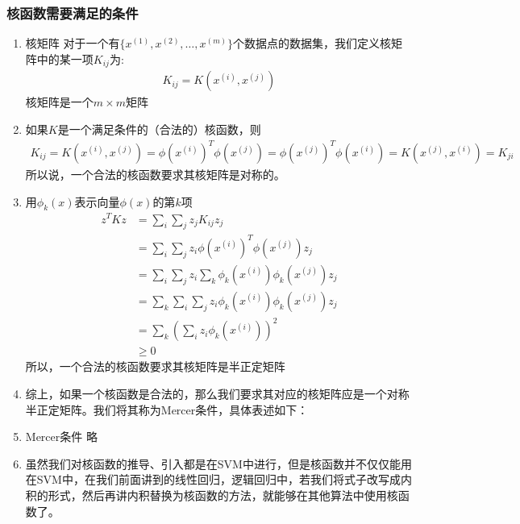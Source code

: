 \subsubsection{核函数需要满足的条件}
\begin{enumerate}
	\item 核矩阵
	对于一个有$\{x^{(1)}, x^{(2)}, \dots, x^{(m)}\}$个数据点的数据集，我们定义核矩阵中的某一项$K_{ij}$为:
	\begin{align}
		K_{ij} = K(x^{(i)}, x^{(j)})
	\end{align}
	核矩阵是一个$m\times m$矩阵
	\item 如果$K$是一个满足条件的（合法的）核函数，则
	\begin{align}
		K_{ij} = K(x^{(i)}, x^{(j)}) = \phi(x^{(i)})^T\phi(x^{(j)}) = \phi(x^{(j)})^T\phi(x^{(i)}) = K(x^{(j)}, x^{(i)}) = K_{ji}
	\end{align}
	所以说，一个合法的核函数要求其核矩阵是对称的。
	\item 用$\phi_k(x)$表示向量$\phi(x)$的第$k$项
	\begin{align}
		z^TKz &= \sum_{i}\sum_{j}z_j K_{ij} z_j \\
		&= \sum_{i}\sum_{j} z_i \phi(x^{(i)})^T \phi(x^{(j)}) z_j \\
		&= \sum_{i}\sum_{j}z_i \sum_{k}\phi_k(x^{(i)})\phi_k(x^{(j)})z_j \\
		&= \sum_{k}\sum_{i}\sum_{j}z_i \phi_k(x^{(i)}) \phi_k(x^{(j)}) z_j \\
		&= \sum_{k} \left(\sum_{i}z_i \phi_k(x^{(i)}) \right)^2 \\
		& \geq 0
	\end{align}
	所以，一个合法的核函数要求其核矩阵是半正定矩阵
	\item 综上，如果一个核函数是合法的，那么我们要求其对应的核矩阵应是一个对称半正定矩阵。我们将其称为Mercer条件，具体表述如下：
	\item Mercer条件
	略
	\item 虽然我们对核函数的推导、引入都是在SVM中进行，但是核函数并不仅仅能用在SVM中，在我们前面讲到的线性回归，逻辑回归中，若我们将式子改写成内积的形式，然后再讲内积替换为核函数的方法，就能够在其他算法中使用核函数了。
\end{enumerate}


